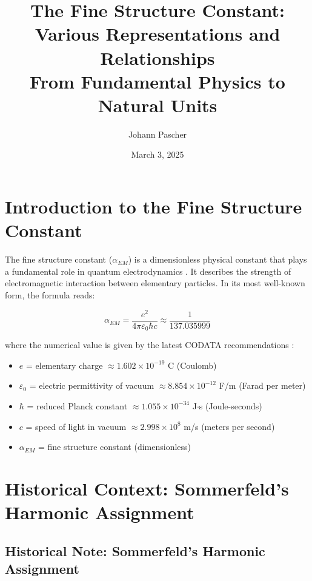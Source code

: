 \documentclass[12pt,a4paper]{article}
\begin{document}
	
	\title{The Fine Structure Constant: Various Representations and Relationships \\
		From Fundamental Physics to Natural Units}
	\author{Johann Pascher}
	\date{March 3, 2025}
	
	\maketitle
	\tableofcontents
	\section{Introduction to the Fine Structure Constant}
	
	The fine structure constant ($\alpha_{EM}$) is a dimensionless physical constant that plays a fundamental role in quantum electrodynamics \cite{Jackson1999}. It describes the strength of electromagnetic interaction between elementary particles. In its most well-known form, the formula reads:
	
	\begin{equation}
		\alpha_{EM} = \frac{e^2}{4\pi\varepsilon_0\hbar c} \approx \frac{1}{137.035999}
	\end{equation}
	
	where the numerical value is given by the latest CODATA recommendations \cite{Mohr2016}:
	\begin{itemize}
		\item $e$ = elementary charge $\approx 1.602 \times 10^{-19}$ C (Coulomb)
		\item $\varepsilon_0$ = electric permittivity of vacuum $\approx 8.854 \times 10^{-12}$ F/m (Farad per meter)
		\item $\hbar$ = reduced Planck constant $\approx 1.055 \times 10^{-34}$ J$\cdot$s (Joule-seconds)
		\item $c$ = speed of light in vacuum $\approx 2.998 \times 10^8$ m/s (meters per second)
		\item $\alpha_{EM}$ = fine structure constant (dimensionless)
	\end{itemize}
\section{Historical Context: Sommerfeld's Harmonic Assignment}

\subsection{Historical Note: Sommerfeld's Harmonic Assignment}
\end{document}
